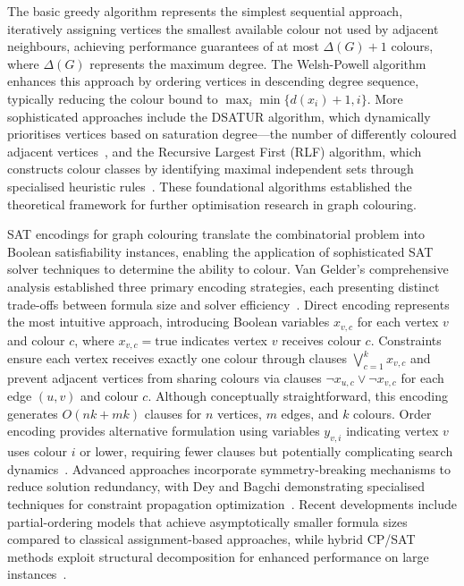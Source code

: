 The basic greedy algorithm represents the simplest sequential approach, iteratively assigning vertices the smallest available colour not used by adjacent neighbours, achieving performance guarantees of at most $\Delta(G) + 1$ colours, where $\Delta(G)$ represents the maximum degree. The Welsh-Powell algorithm enhances this approach by ordering vertices in descending degree sequence, typically reducing the colour bound to $\max_i \min\{d(x_i) + 1, i\}$. More sophisticated approaches include the DSATUR algorithm, which dynamically prioritises vertices based on saturation degree---the number of differently coloured adjacent vertices~\cite{brelaz1979new}, and the Recursive Largest First (RLF) algorithm, which constructs colour classes by identifying maximal independent sets through specialised heuristic rules~\cite{leighton1979graph}. These foundational algorithms established the theoretical framework for further optimisation research in graph colouring.

SAT encodings for graph colouring translate the combinatorial problem into Boolean satisfiability instances, enabling the application of sophisticated SAT solver techniques to determine the ability to colour. Van Gelder's comprehensive analysis established three primary encoding strategies, each presenting distinct trade-offs between formula size and solver efficiency~\cite{vangelder2008another}.
Direct encoding represents the most intuitive approach, introducing Boolean variables $x_{v,c}$ for each vertex $v$ and colour $c$, where $x_{v,c} = \text{true}$ indicates vertex $v$ receives colour $c$. Constraints ensure each vertex receives exactly one colour through clauses $\bigvee_{c=1}^k x_{v,c}$ and prevent adjacent vertices from sharing colours via clauses $\neg x_{u,c} \vee \neg x_{v,c}$ for each edge $(u,v)$ and colour $c$. Although conceptually straightforward, this encoding generates $O(nk + mk)$ clauses for $n$ vertices, $m$ edges, and $k$ colours.
Order encoding provides alternative formulation using variables $y_{v,i}$ indicating vertex $v$ uses colour $i$ or lower, requiring fewer clauses but potentially complicating search dynamics~\cite{faber2024sat}. Advanced approaches incorporate symmetry-breaking mechanisms to reduce solution redundancy, with Dey and Bagchi demonstrating specialised techniques for constraint propagation optimization~\cite{dey2013satisfiability}. Recent developments include partial-ordering models that achieve asymptotically smaller formula sizes compared to classical assignment-based approaches, while hybrid CP/SAT methods exploit structural decomposition for enhanced performance on large instances~\cite{hebrard2018clause}.

